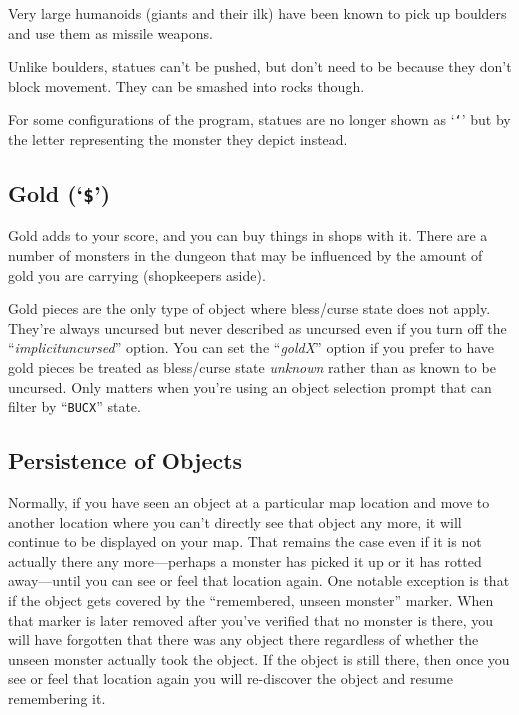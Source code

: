 \documentclass[titlepage]{article}
\begin{document}
Very large humanoids (giants and their ilk) have been known to pick up
boulders and use them as missile weapons.

Unlike boulders, statues can't be pushed, but don't need to be because
they don't block movement.
They can be smashed into rocks though.

For some configurations of the program, statues are no longer shown
as `\texttt{`}'
but by the letter representing the monster they depict instead.

\subsection*{Gold (`\texttt{\$}')}

Gold adds to your score, and you can buy things in shops with it.
There are a number
of monsters in the dungeon that may be influenced by the amount of gold
you are carrying (shopkeepers aside).

Gold pieces are the only type of object where bless/curse state does not
apply.
They're always uncursed but never described as uncursed even if you turn
off the ``\textit{implicit\textunderscore uncursed}'' option.
You can set the ``\textit{goldX}''
option if you prefer to have gold pieces be treated as bless/curse state
\textit{unknown} rather than as known to be uncursed.
Only matters when you're using an object selection prompt that can filter
by ``\texttt{BUCX}'' state.

\subsection*{Persistence of Objects}

Normally, if you have seen an object at a particular map location and
move to another location where you can't directly see that object any
more, it will continue to be displayed on your map.
That remains the case even if it is not actually there any
more---perhaps a monster has picked it up or it has rotted away---until
you can see or feel that location again.
One notable exception is that if the object gets covered by the
``remembered, unseen monster'' marker.
When that marker is later removed
after you've verified that no monster is there, you will have forgotten that
there was any object there regardless of whether the unseen monster
actually took the object.
If the object is still there, then once you see or feel that location
again you will re-discover the object and resume remembering it.
\end{document}
